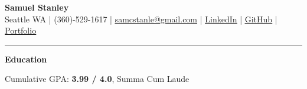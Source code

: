 \documentclass[9pt]{article}
\begin{document}
  \begin{center}
    {\fontsize{20}{20}\selectfont \textbf{Samuel Stanley}}\\[5pt]
    Seattle WA | (360)-529-1617 |
    \href{mailto:samcstanle@gmail.com}{\uline{samcstanle@gmail.com}} |
    \href{https://www.linkedin.com/in/samuel-stanley-1ba48b24a/}{\uline{LinkedIn}} |
    \href{https://github.com/SamStan4}{\uline{GitHub}} |
    \href{https://www.youtube.com/watch?v=dQw4w9WgXcQ&ab_channel=RickAstley}{\uline{Portfolio}}  %
    \rule{\linewidth}{0.4pt}
  \end{center}
  \vspace{-15pt}
  \begin{center}
    {\fontsize{15}{20}\selectfont \textbf{Education}}
  \end{center}
  \vspace{-15pt}
  \noindent
  \noindent
  \vspace{5pt}
  Cumulative GPA: \textbf{3.99 / 4.0}, Summa Cum Laude
\end{document}
